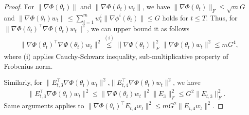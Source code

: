 \documentclass[twoside]{article} %
\def\eqref#1{equation~\ref{#1}}
\theoremstyle{plain}
\theoremstyle{definition}
\theoremstyle{remark}
\newcommand{\fL}{\mathcal{L}}
\begin{document}
\begin{proof}
For $\|\nabla \Phi(\theta_t)\|$ and $\|\nabla \Phi(\theta_t)w_t\|$, we have
$\|\nabla \Phi(\theta_t) \|_F\leq \sqrt{m}G$ and $\|\nabla \Phi(\theta_t)w_t \| \leq \sum_{i=1}^{m}w_t^i\| \nabla \phi^i(\theta_t)\|\leq G$ holds for $t\leq T$. Thus, for $\|\nabla\Phi(\theta_t)^{\top}\nabla \Phi(\theta_t){w}_t \|^2$, we can upper bound it as follows
\begin{align}
    &\|\nabla\Phi(\theta_t)^{\top}\nabla \Phi(\theta_t){w}_t \|^2\overset{(i)}{\leq} \|\nabla\Phi(\theta_t)\|_F^2\|\nabla\Phi(\theta_t)w_t \|^2\leq {m G^4},
\end{align}
where (i) applies Cauchy-Schwarz inequality, sub-multiplicative property of Frobenius norm.

Similarly, for $ \|E_{t,3}^{\top}\nabla \Phi(\theta_t){w}_t \|^2$,$\|E_{t,4}^{\top}\nabla \Phi(\theta_t){w}_t \|^2$, we have
\begin{align}
    \| E_{t,3}^{\top}\nabla \Phi(\theta_t){w}_t \|^2
    \leq \|\nabla\Phi(\theta_t){w}_t\|^2 \|E_3 \|_F^2\leq {G^2 \|E_{t,3} \|_F^2}.\nonumber
\end{align}
Same arguments applies to $\|\nabla\Phi(\theta_t)^{\top}E_{t,4}{w}_t \|^2\leq mG^2 \|E_{t,4}{w}_t\|^2$.


\end{proof}
\end{document}
